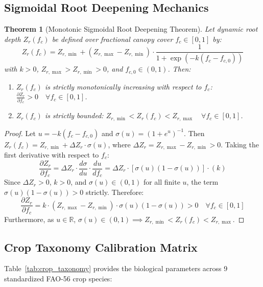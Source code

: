 \documentclass[11pt,a4paper]{article}
\newtheorem{theorem}{Theorem}[section]
\theoremstyle{definition}
\theoremstyle{remark}
\begin{document}
\subsection{Sigmoidal Root Deepening Mechanics}
\begin{theorem}[Monotonic Sigmoidal Root Deepening Theorem]
Let dynamic root depth $Z_r(f_c)$ be defined over fractional canopy cover $f_c \in [0, 1]$ by:
\begin{equation}
    \label{eq:root_sigmoid}
    Z_r(f_c) = Z_{r,\min} + (Z_{r,\max} - Z_{r,\min}) \cdot \frac{1}{1 + \exp\left(-k (f_c - f_{c,0})\right)}
\end{equation}
with $k > 0$, $Z_{r,\max} > Z_{r,\min} > 0$, and $f_{c,0} \in (0, 1)$. Then:
\begin{enumerate}
    \item $Z_r(f_c)$ is strictly monotonically increasing with respect to $f_c$: $\frac{\partial Z_r}{\partial f_c} > 0 \quad \forall f_c \in [0, 1]$.
    \item $Z_r(f_c)$ is strictly bounded: $Z_{r,\min} < Z_r(f_c) < Z_{r,\max} \quad \forall f_c \in [0, 1]$.
\end{enumerate}
\end{theorem}

\begin{proof}
Let $u = -k(f_c - f_{c,0})$ and $\sigma(u) = (1 + e^u)^{-1}$. Then $Z_r(f_c) = Z_{r,\min} + \Delta Z_r \cdot \sigma(u)$, where $\Delta Z_r = Z_{r,\max} - Z_{r,\min} > 0$. Taking the first derivative with respect to $f_c$:
\begin{equation}
    \frac{\partial Z_r}{\partial f_c} = \Delta Z_r \cdot \frac{d\sigma}{du} \cdot \frac{du}{df_c} = \Delta Z_r \cdot \left[ \sigma(u) (1 - \sigma(u)) \right] \cdot (k)
\end{equation}
Since $\Delta Z_r > 0$, $k > 0$, and $\sigma(u) \in (0, 1)$ for all finite $u$, the term $\sigma(u)(1 - \sigma(u)) > 0$ strictly. Therefore:
\begin{equation}
    \frac{\partial Z_r}{\partial f_c} = k \cdot (Z_{r,\max} - Z_{r,\min}) \cdot \sigma(u) (1 - \sigma(u)) > 0 \quad \forall f_c \in [0, 1]
\end{equation}
Furthermore, as $u \in \mathbb{R}$, $\sigma(u) \in (0, 1) \implies Z_{r,\min} < Z_r(f_c) < Z_{r,\max}$.
\end{proof}

\subsection{Crop Taxonomy Calibration Matrix}
Table~\ref{tab:crop_taxonomy} provides the biological parameters across 9 standardized FAO-56 crop species:
\end{document}
